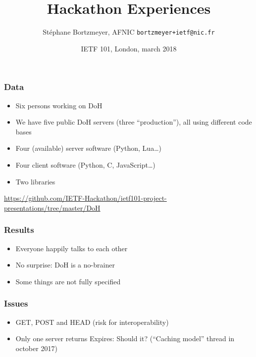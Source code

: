 \documentclass{beamer}
\author[Stéphane Bortzmeyer]
{
  Stéphane Bortzmeyer, AFNIC \texttt{bortzmeyer+ietf@nic.fr}
}
\title[Hackathon]{Hackathon Experiences}
\date[IETF 101]
{IETF 101, London, march 2018}
\begin{document}
\begin{frame}
\titlepage  
\end{frame}

\begin{frame}
  \frametitle{Data}
  \begin{itemize}
  \item Six persons working on DoH
  \item We have five public DoH servers (three ``production''), all
    using different code bases
  \item Four (available) server software (Python, Lua…)
  \item Four client software (Python, C, JavaScript…)
  \item Two libraries  
  \end{itemize}
  \url{https://github.com/IETF-Hackathon/ietf101-project-presentations/tree/master/DoH}
\end{frame}

\begin{frame}
  \frametitle{Results}
  \begin{itemize}
  \item Everyone happily talks to each other
  \item No surprise: DoH is a no-brainer
  \item Some things are not fully specified  
  \end{itemize}
\end{frame}

\begin{frame}
  \frametitle{Issues}
  \begin{itemize}
  \item GET, POST and HEAD (risk for interoperability)
  \item Only one server returns Expires: Should it? (``Caching model''
    thread in october 2017)
  \end{itemize}
\end{frame}
\end{document}
